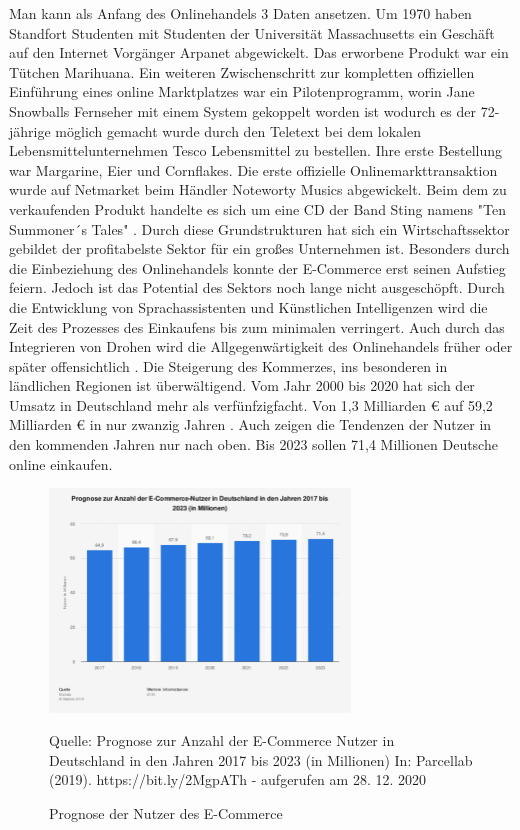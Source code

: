 \documentclass[a4paper, 12pt]{scrartcl}
\newcommand*{\bildquelle}{%
  \footnotesize Quelle:
}
\begin{document}
        
        Man kann als Anfang des Onlinehandels 3 Daten ansetzen. Um 1970 haben Standfort Studenten mit Studenten der Universität Massachusetts ein Geschäft auf den Internet Vorgänger Arpanet abgewickelt. Das erworbene Produkt war ein Tütchen Marihuana. Ein weiteren Zwischenschritt zur kompletten offiziellen Einführung eines online Marktplatzes war ein Pilotenprogramm, worin Jane Snowballs Fernseher mit einem System gekoppelt worden ist wodurch es der 72-jährige möglich gemacht wurde durch den Teletext bei dem lokalen Lebensmittelunternehmen Tesco Lebensmittel zu bestellen. Ihre erste Bestellung war Margarine, Eier und Cornflakes. Die erste offizielle Onlinemarkttransaktion wurde auf Netmarket beim Händler Noteworty Musics abgewickelt. Beim dem zu verkaufenden Produkt handelte es sich um eine CD der Band Sting namens "Ten Summoner´s Tales" \cite{bihler}. Durch diese Grundstrukturen hat sich ein Wirtschaftssektor gebildet der profitabelste Sektor für ein großes Unternehmen ist. Besonders durch die Einbeziehung des Onlinehandels konnte der E-Commerce erst seinen Aufstieg feiern. Jedoch ist das Potential des Sektors noch lange nicht ausgeschöpft. Durch die Entwicklung von Sprachassistenten und Künstlichen Intelligenzen wird die Zeit des Prozesses des Einkaufens bis zum minimalen verringert. Auch durch das Integrieren von Drohen wird die Allgegenwärtigkeit des Onlinehandels früher oder später offensichtlich \cite{leopold}. Die Steigerung des Kommerzes, ins besonderen in ländlichen Regionen ist überwältigend. Vom Jahr 2000 bis 2020 hat sich der Umsatz in Deutschland mehr als verfünfzigfacht. Von 1,3 Milliarden € auf 59,2 Milliarden € in nur zwanzig Jahren \cite{poleshov}. Auch zeigen die Tendenzen der Nutzer in den kommenden Jahren nur nach oben. Bis 2023 sollen 71,4 Millionen Deutsche online einkaufen.

 \begin{figure}[h]
    \begin{center}
        \includegraphics[width=8cm]{media/1.png}
        \caption{Prognose der Nutzer des E-Commerce}
        \label{Prognose Nutzer}
        \bildquelle  Prognose zur Anzahl der E-Commerce Nutzer in Deutschland in den Jahren 2017 bis 2023 (in Millionen) In: Parcellab (2019). https://bit.ly/2MgpATh - aufgerufen am 28. 12. 2020
    \end{center}
\end{figure}
\end{document}
